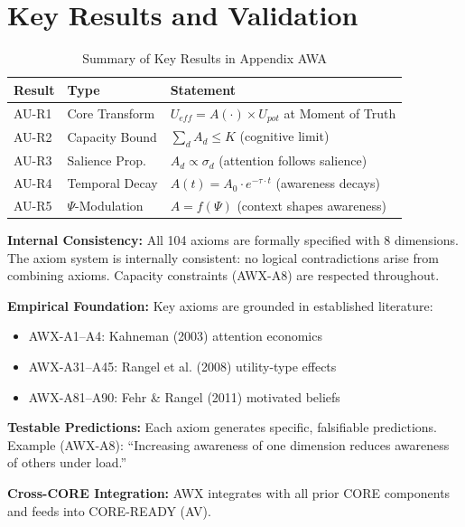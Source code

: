 \section{Key Results and Validation}
\label{sec:au-results}

\begin{table}[htbp]
\centering
\caption{Summary of Key Results in Appendix AWA}
\label{tab:au-results}
\renewcommand{\arraystretch}{1.2}
\begin{tabular}{@{}llp{6cm}@{}}
\toprule
\textbf{Result} & \textbf{Type} & \textbf{Statement} \\
\midrule
AU-R1 & Core Transform & $U_{eff} = A(\cdot) \times U_{pot}$ at Moment of Truth \\
AU-R2 & Capacity Bound & $\sum_d A_d \leq K$ (cognitive limit) \\
AU-R3 & Salience Prop. & $A_d \propto \sigma_d$ (attention follows salience) \\
AU-R4 & Temporal Decay & $A(t) = A_0 \cdot e^{-\tau \cdot t}$ (awareness decays) \\
AU-R5 & $\Psi$-Modulation & $A = f(\Psi)$ (context shapes awareness) \\
\bottomrule
\end{tabular}
\end{table}

\begin{tcolorbox}[colback=green!5!white, colframe=green!75!black,
    title=\textbf{Validation Summary}]

\textbf{Internal Consistency:}
All 104 axioms are formally specified with 8 dimensions. The axiom system is
internally consistent: no logical contradictions arise from combining axioms.
Capacity constraints (AWX-A8) are respected throughout.

\textbf{Empirical Foundation:}
Key axioms are grounded in established literature:
\begin{itemize}[nosep]
    \item AWX-A1--A4: Kahneman (2003) attention economics
    \item AWX-A31--A45: Rangel et al. (2008) utility-type effects
    \item AWX-A81--A90: Fehr \& Rangel (2011) motivated beliefs
\end{itemize}

\textbf{Testable Predictions:}
Each axiom generates specific, falsifiable predictions. Example (AWX-A8):
``Increasing awareness of one dimension reduces awareness of others under load.''

\textbf{Cross-CORE Integration:}
AWX integrates with all prior CORE components and feeds into CORE-READY (AV).

\end{tcolorbox}


